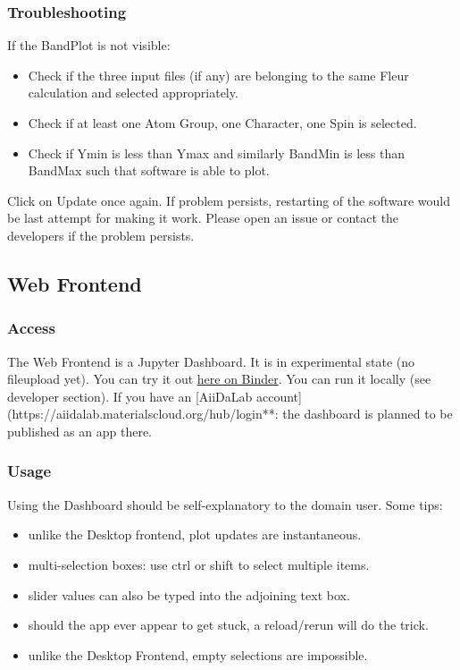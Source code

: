 \documentclass[]{article}
\providecommand{\tightlist}{%
  \setlength{\itemsep}{0pt}\setlength{\parskip}{0pt}}
\begin{document}
\subsubsection{Troubleshooting}\label{troubleshooting}

If the BandPlot is not visible:

\begin{itemize}
\tightlist
\item
  Check if the three input files (if any) are belonging to the same
  Fleur calculation and selected appropriately.
\item
  Check if at least one Atom Group, one Character, one Spin is selected.
\item
  Check if Ymin is less than Ymax and similarly BandMin is less than
  BandMax such that software is able to plot.
\end{itemize}

Click on Update once again. If problem persists, restarting of the
software would be last attempt for making it work. Please open an issue
or contact the developers if the problem persists.

\subsection{Web Frontend}\label{web-frontend}

\subsubsection{Access}\label{access}

The Web Frontend is a Jupyter Dashboard. It is in experimental state (no
fileupload yet). You can try it out
\href{https://mybinder.org/v2/gh/JuDFTteam/masci-tools/studentproject18ws?filepath=studentproject18w\%2Ffrontend\%2Fjupyter\%2Fdemo\%2Fbinder_demo.ipynb}{here
on Binder}. You can run it locally (see developer section). If you have
an {[}AiiDaLab
account{]}(https://aiidalab.materialscloud.org/hub/login**: the
dashboard is planned to be published as an app there.

\subsubsection{Usage}\label{usage-1}

Using the Dashboard should be self-explanatory to the domain user. Some
tips:

\begin{itemize}
\tightlist
\item
  unlike the Desktop frontend, plot updates are instantaneous.
\item
  multi-selection boxes: use ctrl or shift to select multiple items.
\item
  slider values can also be typed into the adjoining text box.
\item
  should the app ever appear to get stuck, a reload/rerun will do the
  trick.
\item
  unlike the Desktop Frontend, empty selections are impossible.
\end{itemize}
\end{document}
